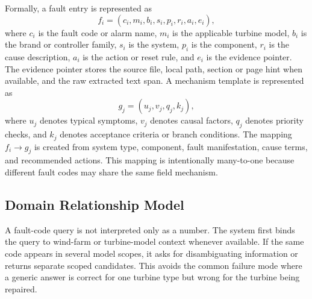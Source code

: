 \documentclass[lettersize,journal]{IEEEtran}
\begin{document}
Formally, a fault entry is represented as
\begin{equation}
f_i=(c_i,m_i,b_i,s_i,p_i,r_i,a_i,e_i),
\end{equation}
where $c_i$ is the fault code or alarm name, $m_i$ is the applicable turbine model, $b_i$ is the brand or controller family, $s_i$ is the system, $p_i$ is the component, $r_i$ is the cause description, $a_i$ is the action or reset rule, and $e_i$ is the evidence pointer. The evidence pointer stores the source file, local path, section or page hint when available, and the raw extracted text span. A mechanism template is represented as
\begin{equation}
g_j=(u_j,v_j,q_j,k_j),
\end{equation}
where $u_j$ denotes typical symptoms, $v_j$ denotes causal factors, $q_j$ denotes priority checks, and $k_j$ denotes acceptance criteria or branch conditions. The mapping $f_i \rightarrow g_j$ is created from system type, component, fault manifestation, cause terms, and recommended actions. This mapping is intentionally many-to-one because different fault codes may share the same field mechanism.

\subsection{Domain Relationship Model}
A fault-code query is not interpreted only as a number. The system first binds the query to wind-farm or turbine-model context whenever available. If the same code appears in several model scopes, it asks for disambiguating information or returns separate scoped candidates. This avoids the common failure mode where a generic answer is correct for one turbine type but wrong for the turbine being repaired.
\end{document}
